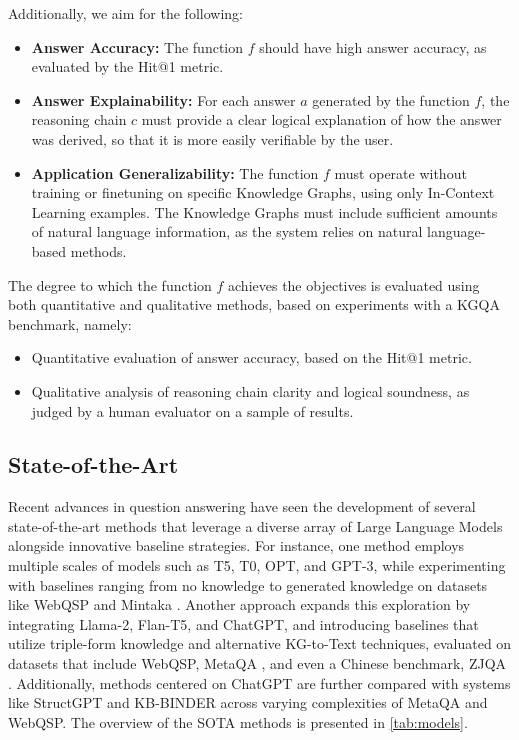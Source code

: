 \documentclass[pdflatex,sn-mathphys-num]{sn-jnl}%
\theoremstyle{thmstyleone}%
\theoremstyle{thmstyletwo}%
\theoremstyle{thmstylethree}%
\begin{document}
\vspace{4mm}

Additionally, we aim for the following:
\begin{itemize}
    \item \textbf{Answer Accuracy:} The function $f$ should have high answer accuracy, as evaluated by the Hit@1 metric.
    \item \textbf{Answer Explainability:} For each answer $a$ generated by the function $f$, the reasoning chain $c$ must provide a clear logical explanation of how the answer was derived, so that it is more easily verifiable by the user.
    \item \textbf{Application Generalizability:} The function $f$ must operate without training or finetuning on specific Knowledge Graphs, using only In-Context Learning examples. The Knowledge Graphs must include sufficient amounts of natural language information, as the system relies on natural language-based methods.
\end{itemize}

The degree to which the function $f$ achieves the objectives is evaluated using both quantitative and qualitative methods, based on experiments with a KGQA benchmark, namely:
\begin{itemize}
    \item Quantitative evaluation of answer accuracy, based on the Hit@1 metric.
    \item Qualitative analysis of reasoning chain clarity and logical soundness, as judged by a human evaluator on a sample of results.
\end{itemize}


\subsection{State-of-the-Art}\label{sec:models}

Recent advances in question answering have seen the development of several state-of-the-art methods that leverage a diverse array of Large Language Models alongside innovative baseline strategies. For instance, one method employs multiple scales of models such as T5, T0, OPT, and GPT-3, while experimenting with baselines ranging from no knowledge to generated knowledge on datasets like WebQSP \cite{Yih2016} and Mintaka \cite{Sen2022}. Another approach expands this exploration by integrating Llama-2, Flan-T5, and ChatGPT, and introducing baselines that utilize triple-form knowledge and alternative KG-to-Text techniques, evaluated on datasets that include WebQSP, MetaQA \cite{Zhang}, and even a Chinese benchmark, ZJQA \cite{Wu2023}. Additionally, methods centered on ChatGPT are further compared with systems like StructGPT and KB-BINDER across varying complexities of MetaQA and WebQSP. The overview of the SOTA methods is presented in \autoref{tab:models}.
\end{document}
